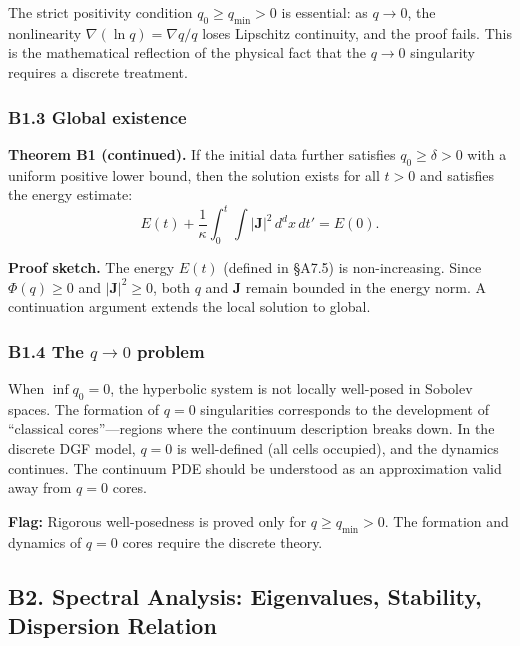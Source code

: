 \documentclass[reprint]{revtex4-2}
\begin{document}
The strict positivity condition $q_0 \ge q_{\min} > 0$ is essential: as $q\to 0$, the nonlinearity $\nabla(\ln q) = \nabla q/q$ loses Lipschitz continuity, and the proof fails. This is the mathematical reflection of the physical fact that the $q\to 0$ singularity requires a discrete treatment.

\subsubsection{B1.3 Global existence}

\textbf{Theorem B1 (continued).} If the initial data further satisfies $q_0 \ge \delta > 0$ with a uniform positive lower bound, then the solution exists for all $t > 0$ and satisfies the energy estimate:
\begin{equation}
E(t) + \frac{1}{\kappa}\int_0^t \int |\mathbf{J}|^2\,d^d x\,dt' = E(0).
\end{equation}

\textbf{Proof sketch.} The energy $E(t)$ (defined in \S A7.5) is non-increasing. Since $\Phi(q) \ge 0$ and $|\mathbf{J}|^2 \ge 0$, both $q$ and $\mathbf{J}$ remain bounded in the energy norm. A continuation argument extends the local solution to global.

\subsubsection{B1.4 The $q\to 0$ problem}

When $\inf q_0 = 0$, the hyperbolic system is not locally well-posed in Sobolev spaces. The formation of $q=0$ singularities corresponds to the development of ``classical cores''---regions where the continuum description breaks down. In the discrete DGF model, $q=0$ is well-defined (all cells occupied), and the dynamics continues. The continuum PDE should be understood as an approximation valid away from $q=0$ cores.

\textbf{Flag:} Rigorous well-posedness is proved only for $q \ge q_{\min} > 0$. The formation and dynamics of $q=0$ cores require the discrete theory.

\subsection{B2. Spectral Analysis: Eigenvalues, Stability, Dispersion Relation}
\end{document}
